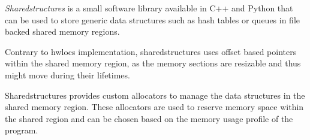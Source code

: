 \emph{Sharedstructures} \cite{sharedstructures} is a small software library available in C++ and Python that can be used to store generic data structures
such as hash tables or queues in file backed shared memory regions.

Contrary to hwlocs implementation, sharedstructures uses offset based pointers within the shared memory region,
as the memory sections are resizable and thus might move during their lifetimes.

Sharedstructures provides custom allocators to manage the data structures in the shared memory region.
These allocators are used to reserve memory space within the shared region and can be chosen based on the memory usage profile of the program.
